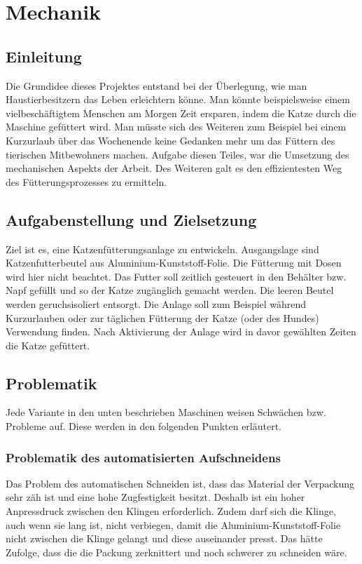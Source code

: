 \chapter{Mechanik}
\section{Einleitung}

Die Grundidee dieses Projektes entstand bei der Überlegung, wie man Haustierbesitzern das Leben erleichtern könne. Man könnte beispielsweise einem vielbeschäftigtem Menschen am Morgen Zeit ersparen, indem die Katze durch die Maschine gefüttert wird. Man müsste sich des Weiteren zum Beispiel bei einem Kurzurlaub über das Wochenende keine Gedanken mehr um das Füttern des tierischen Mitbewohners machen. Aufgabe diesen Teiles, war die Umsetzung des mechanischen Aspekts der Arbeit. Des Weiteren galt es den effizientesten Weg des Fütterungsprozesses zu ermitteln.
 
\section{Aufgabenstellung und Zielsetzung}

Ziel ist es, eine Katzenfütterungsanlage zu entwickeln. Ausgangslage sind Katzenfutterbeutel aus Aluminium-Kunststoff-Folie. Die Fütterung mit Dosen wird hier nicht beachtet. Das Futter soll zeitlich gesteuert in den Behälter bzw. Napf gefüllt und so der Katze zugänglich gemacht werden. Die leeren Beutel werden geruchsisoliert entsorgt. Die Anlage soll zum Beispiel während Kurzurlauben oder zur täglichen Fütterung der Katze (oder des Hundes) Verwendung finden. Nach Aktivierung der Anlage wird in davor gewählten Zeiten die Katze gefüttert. 


\section{Problematik}

Jede Variante in den unten beschrieben Maschinen weisen Schwächen bzw. Probleme auf. Diese werden in den folgenden Punkten erläutert.

\subsection{Problematik des automatisierten Aufschneidens}

Das Problem des automatischen Schneiden ist, dass das Material der Verpackung sehr zäh ist und eine hohe Zugfestigkeit besitzt. Deshalb ist ein hoher Anpressdruck zwischen den Klingen erforderlich. Zudem darf sich die Klinge, auch wenn sie lang ist, nicht verbiegen, damit die Aluminium-Kunststoff-Folie nicht zwischen die Klinge gelangt und diese auseinander presst. Das hätte Zufolge, dass die die Packung zerknittert und noch schwerer zu schneiden wäre. 

